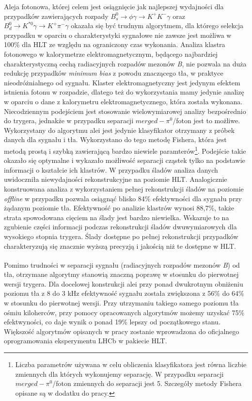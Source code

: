 \documentclass{pracamgr}
\begin{document}
Aleja fotonowa, której celem jest osiągnięcie jak najlepszej wydajności dla przypadków zawierających rozpady $B^{0}_{s}\rightarrow \phi\gamma\rightarrow K^{+}K^{-}\gamma$ oraz $B^{0}_{d}\rightarrow K^{*0}\gamma\rightarrow K^{+}\pi^{-}\gamma$ okazała się być trudnym algorytmem, dla którego selekcja przypadku w oparciu o charakterystyki sygnałowe nie zawsze jest możliwa w 100\% dla HLT ze względu na ograniczony czas wykonania. Analiza klastra fotonowego w kalorymetrze elektromagnetycznym, będącego najbardziej charakterystyczną cechą radiacyjnych rozpadów mezonów \textit{B}, nie pozwala na duża redukcję przypadków \textit{minimum bias} z powodu znaczącego tła, w praktyce nieodróżnialnego od sygnału. Klaster elektromagnetyczny jest jedynym efektem istnienia fotonu w rozpadzie, dlatego też do wykorzystania mamy jedynie analizę w oparciu o dane z kalorymetru elektromagnetycznego, która została wykonana. Niecodziennym podejściem jest stosowanie wielowymiarowej analizy bezpośrednio do trygera, jednakże w przypadku separacji $merged-\pi^0$/foton jest to możliwe. Wykorzystany do algorytmu alei jest jedynie klasyfikator otrzymany z próbek danych dla sygnału i tła. Wykorzystano do tego metodę Fishera, która jest metodą prostą i szybką zawierającą bardzo niewiele paramterów\footnote{Liczba parametrów używana w celu obliczenia klasyfikatora jest równa liczbie zmiennych dla których wykonujemy separację. W przypadku separacji $merged-\pi^0$/foton zmiennych do separacji jest 5. Szczegóły metody Fishera opisane są w dodatku do pracy.}. Podejście takie okazało się optymalne i wykazało możliwość separacji cząstek tylko na podstawie informacji o kształcie ich klastrów. W przypadku śladów analiza danych uwidoczniła niewydajności rekonstrukcyjne na poziomie HLT. Analogicznie konstruowana analiza z wykorzystaniem pełnej rekonstrukcji śladów na poziomie \textit{offline} w przypadku pozwala osiągnąć blisko 84\% efektywności dla sygnału przy żądanym poziomie tła. Efektywność po analizie klastrów wynosi 88,7\%, także strata spowodowana cięciem na ślady jest bardzo niewielka. Wskazuje to na zgubienie części informacji podczas rekonstrukcji śladów dwuwymiarowych dla wysokiego stopnia trygera. Ślady dostępne po pełnej rekonstrukcji przypadków charakteryzują się znacznie wyższą precyzją i jakością niż te dostępne w HLT.
\\\\
\noindent
Pomimo trudności w separacji sygnału (radiacyjnych rozpadów mezonów \textit{B}) od tła, otrzymane algorytmy stanowią znaczną poprawę w stosunku do pierwotnej wersji trygera. Dla docelowej konstrukcji alei przy ponad dwukrotnym obniżeniu poziomu tła z 8 do 3 kHz efektywność sygnału została zwiększona z 56\% do 64\% w stosunku do pierwotnej wersji. Przy utrzymaniu takiego samego poziomu tła ośmiu kiloherców, przy pomocy opracowanych algorytmów możemy uzyskać 75\% efektwyności, co daje wynik o ponad 19\% lepszy od początkowego stanu. Większość algorytmów opisanych w pracy zostanie wprowadzona do oficjalnego oprogramowania eksperymentu LHCb w pakiecie HLT.
\end{document}
